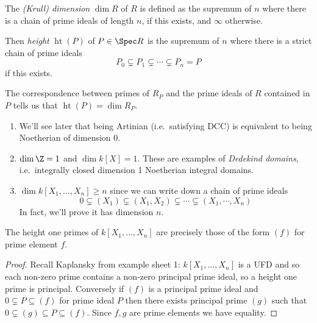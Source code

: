 \documentclass[a4paper]{article}
\DeclareMathOperator{\htt}{ht} %
\begin{document}
\begin{definition}
  The \emph{(Krull) dimension} \(\dim R\) of \(R\) is defined as the supremum of \(n\) where there is a chain of prime ideals of length \(n\), if this exists, and \(\infty\) otherwise.
\end{definition}

\begin{definition}[height]
  Then \emph{height} \(\htt(P)\) of \(P \in \Spec R\) is the supremum of \(n\) where there is a strict chain of prime ideals
  \[
    P_0 \subsetneq P_1 \subsetneq \cdots \subsetneq P_n = P
  \]
  if this exists.
\end{definition}

\begin{note}
  The correspondence between primes of \(R_P\) and the prime ideals of \(R\) contained in \(P\) tells us that \(\htt(P) = \dim R_P\).
\end{note}

\begin{eg}\leavevmode
  \begin{enumerate}
  \item We'll see later that being Artinian (i.e.\ satisfying DCC)  is equivalent to being Noetherian of dimension \(0\).
  \item \(\dim \Z = 1\) and \(\dim k[X] = 1\). These are examples of \emph{Dedekind domains}, i.e.\ integrally closed dimension 1 Noetherian integral domains.
  \item \(\dim k[X_1, \dots, X_n] \geq n\) since we can write down a chain of prime ideals
    \[
      0 \subsetneq (X_1) \subsetneq (X_1, X_2) \subsetneq \cdots \subsetneq (X_1, \cdots, X_n)
    \]
    In fact, we'll prove it has dimension \(n\).
  \end{enumerate}
\end{eg}

\begin{lemma}
  The height one primes of \(k[X_1, \dots, X_n]\) are precisely those of the form \((f)\) for prime element \(f\).
\end{lemma}

\begin{proof}
  Recall Kaplansky from example sheet 1: \(k[X_1, \dots, X_n]\) is a UFD and so each non-zero prime contains a non-zero principal prime ideal, so a height one prime is principal. Conversely if \((f)\) is a principal prime ideal and \(0 \subsetneq P \subseteq (f)\) for prime ideal \(P\) then there exists principal prime \((g)\) such that \(0 \subsetneq (g) \subseteq P \subseteq (f)\). Since \(f, g\) are prime elements we have equality.
\end{proof}
\end{document}
